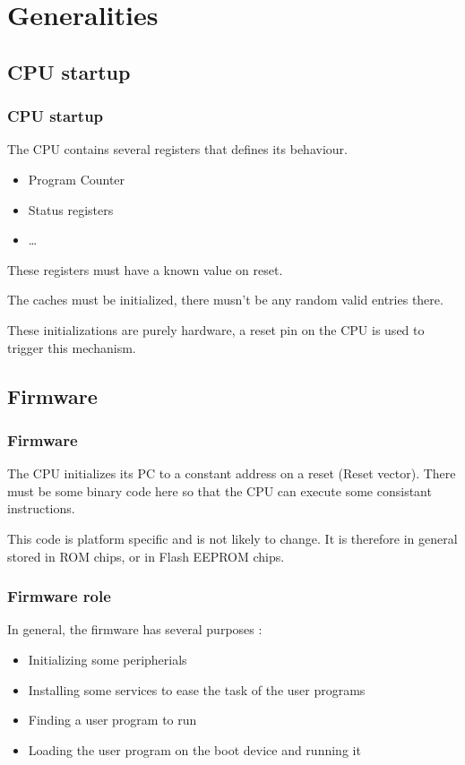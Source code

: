 \section{Generalities}
\subsection{CPU startup}

\begin{frame}
  \frametitle{CPU startup}

  The CPU contains several registers that defines its behaviour.

  \-

  \begin{itemize}
  \item Program Counter
  \item Status registers
  \item \ldots
  \end{itemize}

  \-

  These registers must have a known value on reset.

  \-

  The caches must be initialized, there musn't be any random valid entries there.

  \-

  These initializations are purely hardware, a reset pin on the CPU is used to trigger this mechanism.

\end{frame}

\subsection{Firmware}

\begin{frame}
  \frametitle{Firmware}

  The CPU initializes its PC to a constant address on a reset (Reset vector). There must be some binary code here so that the CPU can execute some consistant instructions.

  \-

  This code is platform specific and is not likely to change. It is therefore in general stored in ROM chips, or in Flash EEPROM chips.

\end{frame}       

\begin{frame}
  \frametitle{Firmware role}

  In general, the firmware has several purposes :
  
  \-

  \begin{itemize}
  \item Initializing some peripherials
  \item Installing some services to ease the task of the user programs
  \item Finding a user program to run
  \item Loading the user program on the boot device and running it
  \end{itemize}

\end{frame}

